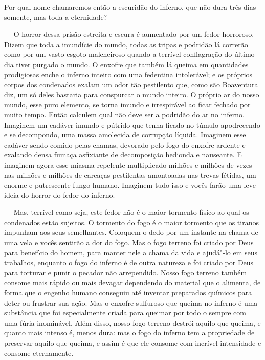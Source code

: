 Por qual nome chamaremos então a escuridão do inferno, que não dura três
dias somente, mas toda a eternidade?


 --- O horror dessa prisão estreita e escura é aumentado por um fedor
horroroso. Dizem que toda a imundície do mundo, todas as tripas e
podridão lá correrão como por um vasto esgoto malcheiroso quando a
terrível conflagração do último dia tiver purgado o mundo. O enxofre
que também lá queima em quantidades prodigiosas enche o inferno inteiro
com uma fedentina intolerável; e os próprios corpos dos condenados
exalam um odor tão pestilento que, como são Boaventura diz, um só deles
bastaria para conspurcar o mundo inteiro. O próprio ar do nosso mundo,
esse puro elemento, se torna imundo e irrespirável ao ficar fechado por
muito tempo. Então calculem qual não deve ser a podridão do ar no
inferno. Imaginem um cadáver imundo e pútrido que tenha ficado no
túmulo apodrecendo e se decompondo, uma massa amolecida de corrupção
líquida. Imaginem esse cadáver sendo comido pelas chamas, devorado pelo
fogo do enxofre ardente e exalando densa fumaça asfixiante de
decomposição hedionda e nauseante.  E imaginem agora esse miasma
repelente multiplicado milhões e milhões de vezes nas milhões e milhões
de carcaças pestilentas amontoadas nas trevas fétidas, um enorme e
putrescente fungo humano. Imaginem tudo isso e vocês farão uma leve
ideia do horror do fedor do inferno.

 --- Mas, terrível como seja, este fedor não é o maior tormento físico ao
qual os condenados estão sujeitos. O tormento do fogo é o maior
tormento que os tiranos impunham aos seus semelhantes. Coloquem o dedo
por um instante na chama de uma vela e vocês sentirão a dor do fogo.
Mas o fogo terreno foi criado por Deus para benefício do homem, para
manter nele a chama da vida e ajudá"-lo em seus trabalhos, enquanto o
fogo do inferno é de outra natureza e foi criado por Deus para torturar
e punir o pecador não arrependido. Nosso fogo terreno também consome
mais rápido ou mais devagar dependendo do material que o alimenta, de
forma que o engenho humano conseguiu até inventar preparados químicos
para deter ou frustrar sua ação. Mas o enxofre sulfuroso que queima no inferno é uma substância que foi
especialmente criada para queimar por todo o sempre com uma fúria
inominável. Além disso, nosso fogo terreno destrói aquilo que queima, e
quanto mais intenso é, menos dura: mas o fogo do inferno tem a
propriedade de preservar aquilo que queima, e assim é que ele consome
com incrível intensidade e consome eternamente.

